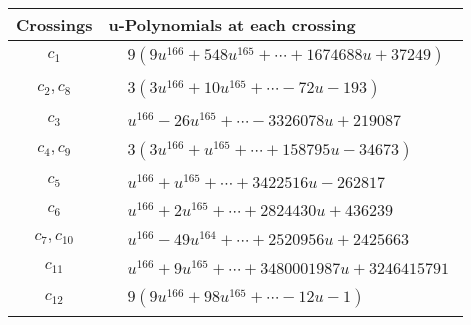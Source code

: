 \documentclass[1p]{elsarticle_modified}
\theoremstyle{definition}
\begin{document}
\begin{tabular}{m{50pt}|m{274pt}}
Crossings & \hspace{64pt}u-Polynomials at each crossing \\
\hline $$\begin{aligned}c_{1}\end{aligned}$$&$\begin{aligned}
&9(9 u^{166}+548 u^{165}+\cdots+1674688 u+37249)
\end{aligned}$\\
\hline $$\begin{aligned}c_{2},c_{8}\end{aligned}$$&$\begin{aligned}
&3(3 u^{166}+10 u^{165}+\cdots-72 u-193)
\end{aligned}$\\
\hline $$\begin{aligned}c_{3}\end{aligned}$$&$\begin{aligned}
&u^{166}-26 u^{165}+\cdots-3326078 u+219087
\end{aligned}$\\
\hline $$\begin{aligned}c_{4},c_{9}\end{aligned}$$&$\begin{aligned}
&3(3 u^{166}+u^{165}+\cdots+158795 u-34673)
\end{aligned}$\\
\hline $$\begin{aligned}c_{5}\end{aligned}$$&$\begin{aligned}
&u^{166}+u^{165}+\cdots+3422516 u-262817
\end{aligned}$\\
\hline $$\begin{aligned}c_{6}\end{aligned}$$&$\begin{aligned}
&u^{166}+2 u^{165}+\cdots+2824430 u+436239
\end{aligned}$\\
\hline $$\begin{aligned}c_{7},c_{10}\end{aligned}$$&$\begin{aligned}
&u^{166}-49 u^{164}+\cdots+2520956 u+2425663
\end{aligned}$\\
\hline $$\begin{aligned}c_{11}\end{aligned}$$&$\begin{aligned}
&u^{166}+9 u^{165}+\cdots+3480001987 u+3246415791
\end{aligned}$\\
\hline $$\begin{aligned}c_{12}\end{aligned}$$&$\begin{aligned}
&9(9 u^{166}+98 u^{165}+\cdots-12 u-1)
\end{aligned}$\\
\hline
\end{tabular}\\~\\
\end{document}
